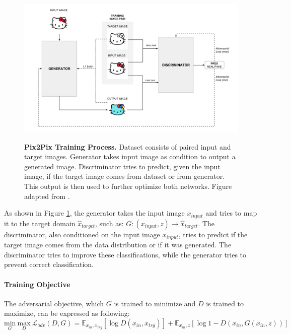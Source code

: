 \documentclass{article}
\begin{document}
\begin{figure}[h]
\centering
{\includegraphics[width=\linewidth]{GAN/pix2pix}}
\caption{\label{fig:pix2pix} \textbf{Pix2Pix Training Process.} Dataset consists of paired input and target images. Generator takes input image as condition to output a generated image. Discriminator tries to predict, given the input image, if the target image comes from dataset or from generator. This output is then used to further optimize both networks. Figure adapted from \cite{hesse_image--image_nodate-1}.}
\end{figure}

As shown in Figure \ref{fig:pix2pix}, the generator takes the input image $x_{input}$ and tries to map it to the target domain $\hat{x}_{target}$, such as: $G: (x_{input}, z) \rightarrow \hat{x}_{target}$. The discriminator, also conditioned on the input image $x_{input}$, tries to predict if the target image comes from the data distribution or if it was generated. The discriminator tries to improve these classifications, while the generator tries to prevent correct classification.


\paragraph{Training Objective}
The adversarial objective, which $G$ is trained to minimize and $D$ is trained to maximize, can be expressed as following:
\begin{equation}
\underset{G}{\mathrm{min}} \ \underset{D}{\mathrm{max}} \ \mathcal{L}_{adv}(D,G) = \mathbb{E}_{x_{in},x_{trg}}[\log D(x_{in},x_{trg})] + \mathbb{E}_{x_{in},z}[\log 1 - D(x_{in}, G(x_{in},z))]
\label{eq:pix2pix_minimax_cond}
\end{equation}
\end{document}
